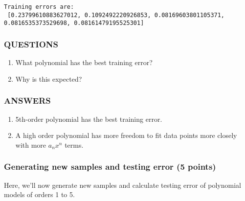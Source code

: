 \documentclass[11pt]{article}
\begin{document}
    \begin{Verbatim}[commandchars=\\\{\}]
Training errors are: 
 [0.23799610883627012, 0.1092492220926853, 0.08169603801105371, 0.0816535373529698, 0.08161479195525301]

    \end{Verbatim}

    \hypertarget{questions}{%
\subsubsection{QUESTIONS}\label{questions}}

\begin{enumerate}
\def\labelenumi{(\arabic{enumi})}
\item
  What polynomial has the best training error?
\item
  Why is this expected?
\end{enumerate}

    \hypertarget{answers}{%
\subsubsection{ANSWERS}\label{answers}}

\begin{enumerate}
\def\labelenumi{(\arabic{enumi})}
\item
  5th-order polynomial has the best training error.
\item
  A high order polynomial has more freedom to fit data points more
  closely with more \(a_{n}\)\(x^{n}\) terms.
\end{enumerate}

    \hypertarget{generating-new-samples-and-testing-error-5-points}{%
\subsubsection{Generating new samples and testing error (5
points)}\label{generating-new-samples-and-testing-error-5-points}}

Here, we'll now generate new samples and calculate testing error of
polynomial models of orders 1 to 5.
\end{document}
